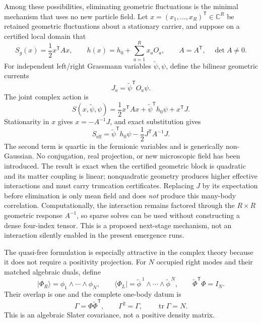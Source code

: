 \documentclass[11pt,letterpaper]{article}
\begin{document}
Among these possibilities, eliminating geometric fluctuations is the minimal
mechanism that uses no new particle field. Let
$x=(x_1,\ldots,x_R)^{\mathsf T}\in\mathbb C^R$ be retained geometric
fluctuations about a stationary carrier, and suppose on a certified local
domain that
\begin{equation*}
  S_g(x)=\frac12x^{\mathsf T}Ax,
  \qquad
  h(x)=h_0+\sum_{a=1}^{R}x_aO_a,
  \qquad A=A^{\mathsf T},\quad \det A\ne0 .
\end{equation*}
For independent left/right Grassmann variables
$\widetilde\psi,\psi$, define the bilinear geometric currents
\begin{equation*}
  J_a=\widetilde\psi^{\mathsf T}O_a\psi .
\end{equation*}
The joint complex action is
\begin{equation*}
  S(x,\widetilde\psi,\psi)
  =\frac12x^{\mathsf T}Ax
   +\widetilde\psi^{\mathsf T}h_0\psi+x^{\mathsf T}J .
\end{equation*}
Stationarity in $x$ gives $x=-A^{-1}J$, and exact substitution gives
\begin{equation*}
  \boxed{
  S_{\mathrm{eff}}
  =\widetilde\psi^{\mathsf T}h_0\psi
   -\frac12J^{\mathsf T}A^{-1}J .}
\end{equation*}
The second term is quartic in the fermionic variables and is generically
non-Gaussian. No conjugation, real projection, or new microscopic field has
been introduced. The result is exact when the certified geometric block is
quadratic and its matter coupling is linear; nonquadratic geometry produces
higher effective interactions and must carry truncation certificates.
Replacing $J$ by its expectation before elimination is only mean field and
does \emph{not} produce this many-body correlation. Computationally, the
interaction remains factored through the $R\times R$ geometric response
$A^{-1}$, so sparse solves can be used without constructing a dense four-index
tensor. This is a proposed next-stage mechanism, not an interaction silently
enabled in the present emergence runs.

The quasi-free formulation is especially attractive in the complex theory
because it does not require a positivity projection. For $N$ occupied right
modes and their matched algebraic duals, define
\begin{equation*}
  \lvert\Phi_R\rangle=\phi_1\wedge\cdots\wedge\phi_N,\qquad
  \langle\Phi_L\rvert
    =\widetilde\phi^{\,1}\wedge\cdots\wedge\widetilde\phi^{\,N},
  \qquad
  \widetilde\Phi^{\mathsf T}\Phi=I_N .
\end{equation*}
Their overlap is one and the complete one-body datum is
\begin{equation*}
  \Gamma=\Phi\widetilde\Phi^{\mathsf T},\qquad
  \Gamma^2=\Gamma,\qquad \operatorname{tr}\Gamma=N.
\end{equation*}
This is an algebraic Slater covariance, not a positive density matrix.
\end{document}

